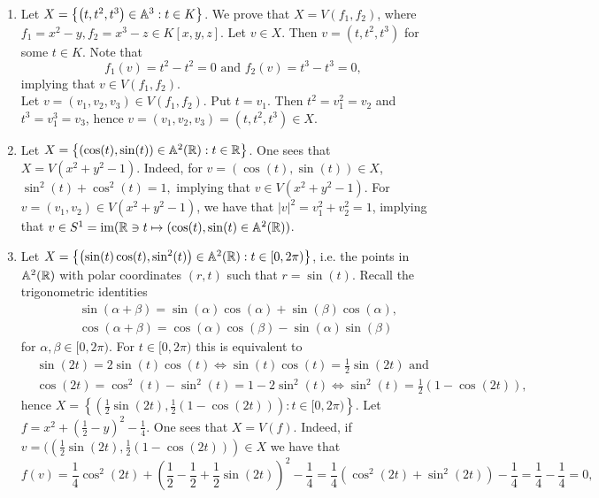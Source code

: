 \begin{example}\label{ExamplesOfAlgebraicSets}
    \begin{enumerate}
        \item Let $X=\left\{\left(t,t^2,t^3\right)\in \mathbb{A}^3 : t\in K\right\}$. We prove that $X= V\left(f_1,f_2\right)$, where $f_1=x^2-y,f_2=x^3-z\in K[x,y,z]$. Let $v\in X$. Then $v=(t,t^2,t^3)$ for some $t\in K$. Note that 
        $$f_1(v)=t^2-t^2=0 \text{ and } f_2(v)=t^3-t^3=0,$$
        implying that $v\in V(f_1,f_2).$\\
        Let $v=(v_1,v_2,v_3)\in V(f_1,f_2)$. Put $t = v_1$. Then $t^2 = v_1^2 = v_2$ and $t^3 = v_1^3=v_3$, hence $v=(v_1,v_2,v_3)=(t,t^2,t^3)\in X$.
        \item Let $X = \left\{(\cos(t),\sin(t))\in \mathbb{A}^2(\mathbb{R}) : t\in \mathbb{R}\right\}$.  One sees that $X= V(x^2+y^2-1)$. Indeed, for $v=(\cos(t),\sin(t))\in X$, $\sin^2(t)+\cos^2(t)=1,$ implying that $v\in V(x^2+y^2-1).$ For $v=(v_1,v_2)\in V(x^2+y^2-1)$, we have that $\vert v\vert^2 =v_1^2+v_2^2 = 1$, implying that $v\in S^1 = \text{im}(\mathbb{R} \ni t \mapsto (\cos(t),\sin(t)\in \mathbb{A}^2(\mathbb{R}))$.
        \item Let $X=\left\{ \left(\sin(t)\cos(t),\sin^2(t)\right)\in \mathbb{A}^2(\mathbb{R}) : t\in [0,2\pi)\right\}$, i.e. the points in $\mathbb{A}^2(\mathbb{R})$ with polar coordinates $(r,t)$ such that $r=\sin(t)$. Recall the trigonometric identities
        \begin{align*}
            &\sin(\alpha+\beta) = \sin(\alpha)\cos(\alpha) +\sin(\beta)\cos(\alpha),\\
            &\cos(\alpha+\beta) = \cos(\alpha)\cos(\beta)-\sin(\alpha)\sin(\beta)
        \end{align*}
        for $\alpha,\beta\in [0,2\pi)$. For $t\in [0,2\pi)$ this is equivalent to 
        \begin{align*}
            &\sin(2t)= 2\sin(t)\cos(t) \iff \sin(t)\cos(t)=\frac{1}{2}\sin(2t) \text{ and }\\
            &\cos(2t) = \cos^2(t)-\sin^2(t) = 1-2\sin^2(t) \iff \sin^2(t)=\frac{1}{2}\left(1-\cos(2t)\right),
        \end{align*}
        hence $X = \left\{ \left(\frac{1}{2}\sin(2t),\frac{1}{2}\left(1-\cos(2t)\right)\right) : t \in [0,2\pi)\right\}.$ Let $f = x^2 + \left(\frac{1}{2}-y\right)^2-\frac{1}{4}$. One sees that $X= V(f)$. Indeed, if $v=(\left(\frac{1}{2}\sin(2t),\frac{1}{2}\left(1-\cos(2t)\right)\right)\in X$ we have that 
        $$f(v)=\frac{1}{4}\cos^2(2t)+\left(\frac{1}{2}-\frac{1}{2}+\frac{1}{2}\sin(2t)\right)^2-\frac{1}{4} =\frac{1}{4}\left(\cos^2(2t)+\sin^2(2t)\right)-\frac{1}{4}=\frac{1}{4}-\frac{1}{4}=0,$$

\end{enumerate}
\end{example}
